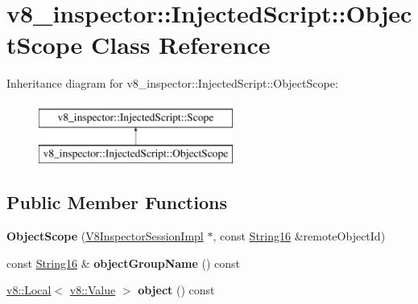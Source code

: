 \hypertarget{classv8__inspector_1_1InjectedScript_1_1ObjectScope}{}\section{v8\+\_\+inspector\+:\+:Injected\+Script\+:\+:Object\+Scope Class Reference}
\label{classv8__inspector_1_1InjectedScript_1_1ObjectScope}
Inheritance diagram for v8\+\_\+inspector\+:\+:Injected\+Script\+:\+:Object\+Scope\+:\begin{figure}[H]
\begin{center}
\leavevmode
\includegraphics[height=2.000000cm]{classv8__inspector_1_1InjectedScript_1_1ObjectScope}
\end{center}
\end{figure}
\subsection*{Public Member Functions}
\begin{DoxyCompactItemize}
\item 
\mbox{\label{classv8__inspector_1_1InjectedScript_1_1ObjectScope_a327b5227b1bc3fc499382e6d27fe960f}} 
{\bfseries Object\+Scope} (\mbox{\hyperlink{classv8__inspector_1_1V8InspectorSessionImpl}{V8\+Inspector\+Session\+Impl}} $\ast$, const \mbox{\hyperlink{classv8__inspector_1_1String16}{String16}} \&remote\+Object\+Id)
\item 
\mbox{\label{classv8__inspector_1_1InjectedScript_1_1ObjectScope_ace1248aa4036679d491fe21d5425f580}} 
const \mbox{\hyperlink{classv8__inspector_1_1String16}{String16}} \& {\bfseries object\+Group\+Name} () const
\item 
\mbox{\label{classv8__inspector_1_1InjectedScript_1_1ObjectScope_a6651bcd4d185a47f350c2797a6c6da24}} 
\mbox{\hyperlink{classv8_1_1Local}{v8\+::\+Local}}$<$ \mbox{\hyperlink{classv8_1_1Value}{v8\+::\+Value}} $>$ {\bfseries object} () const
\end{DoxyCompactItemize}
